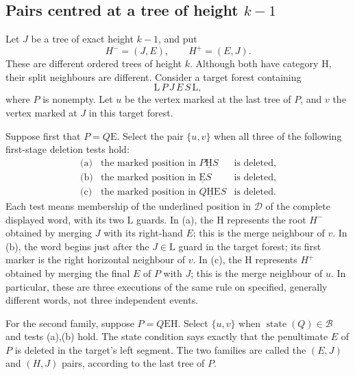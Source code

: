 \documentclass[11pt,a4paper]{article}
\theoremstyle{definition}
\theoremstyle{remark}
\newcommand{\E}{\mathrm E}
\newcommand{\HH}{\mathrm H}
\newcommand{\LL}{\mathrm L}
\DeclareMathOperator{\state}{state}
\begin{document}
\subsection{Pairs centred at a tree of height \texorpdfstring{$k-1$}{k-1}}\label{sec:pairs}
Let $J$ be a tree of exact height $k-1$, and put
\[
H^-=(J,E),\qquad H^+=(E,J).
\]
These are different ordered trees of height $k$. Although both have category $\HH$, their split neighbours are different. Consider a target forest containing
\begin{equation}\label{eq:pairtarget}
\LL\,P\,J\,E\,S\,\LL,
\end{equation}
where $P$ is nonempty. Let $u$ be the vertex marked at the last tree of $P$, and $v$ the vertex marked at $J$ in this target forest.

Suppose first that $P=Q\E$. Select the pair $\{u,v\}$ when all three of the following first-stage deletion tests hold:
\begin{equation}\label{eq:EJconditions}
\begin{array}{lll}
\text{(a)}&\text{the marked position in }P\underline{\HH}S
    &\text{is deleted},\\
\text{(b)}&\text{the marked position in }\underline{\E}S
    &\text{is deleted},\\
\text{(c)}&\text{the marked position in }Q\underline{\HH}\E S
    &\text{is deleted}.
\end{array}
\end{equation}
Each test means membership of the underlined position in $\mathcal D$ of the complete displayed word, with its two $\LL$ guards. In (a), the $\HH$ represents the root $H^-$ obtained by merging $J$ with its right-hand $E$; this is the merge neighbour of $v$. In (b), the word begins just after the $J\in\LL$ guard in the target forest; its first marker is the right horizontal neighbour of $v$. In (c), the $\HH$ represents $H^+$ obtained by merging the final $E$ of $P$ with $J$; this is the merge neighbour of $u$. In particular, these are three executions of the same rule on specified, generally different words, not three independent events.

For the second family, suppose $P=Q\E\HH$. Select $\{u,v\}$ when $\state(Q)\in\mathcal B$ and tests (a),(b) hold. The state condition says exactly that the penultimate $E$ of $P$ is deleted in the target's left segment. The two families are called the $(E,J)$ and $(H,J)$ pairs, according to the last tree of $P$.
\end{document}
